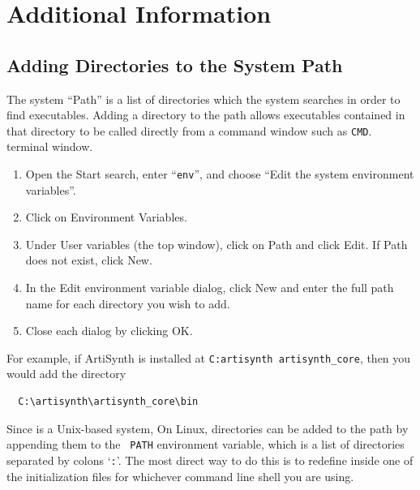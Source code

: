 \section{Additional Information}

\subsection{Adding Directories to the System Path}
\label{SettingPath}

The system ``Path'' is a list of directories which the system searches
in order to find executables. Adding a directory to the path allows
executables contained in that directory to be called directly from a
\ifWindows
command window such as {\tt CMD}.
\else
terminal window.
\fi

\ifWindows

\begin{enumerate}

\item Open the {\sf Start} search, enter ``{\tt env}'', and choose
{\sf ``Edit the system environment variables''}.

\item Click on {\sf Environment Variables}.

\item Under {\sf User variables} (the top window), click on {\sf Path}
and click {\sf Edit}. If {\sf Path} does not exist, click {\sf New}.

\item In the {\sf Edit environment variable} dialog, click {\sf New}
and enter the full path name for each directory you wish to add.

\item Close each dialog by clicking {\sf OK}.

\end{enumerate}

For example, if ArtiSynth is installed at {\tt C:\BKS artisynth\BKS
artisynth\_core}, then you would add the directory
\begin{verbatim}
  C:\artisynth\artisynth_core\bin
\end{verbatim}

\fi %

\ifWindows\else %

\ifMacOS
Since \SYSTEM{} is a Unix-based system, 
\else\ifLinux
On Linux,
\fi %
\fi %
directories can be added to the path by appending them to the {\tt
PATH} environment variable, which is a list of directories separated
by colons `{\tt :}'. The most direct way to do this is to redefine
\PATH{} inside one of the initialization files for whichever
command line shell you are using.

